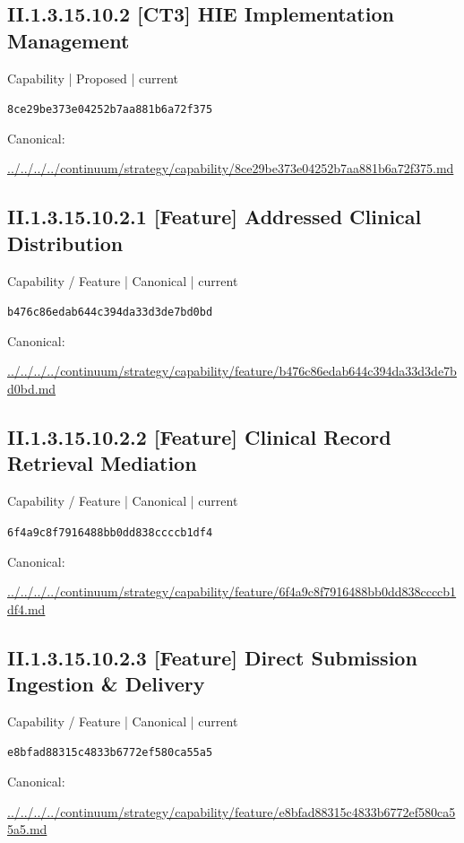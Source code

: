 \documentclass[10pt,a4paper]{article}
\begin{document}
\subsection*{II.1.3.15.10.2 [CT3] HIE Implementation Management}
{\small Capability | Proposed | current}\par
\texttt{8ce29be373e04252b7aa881b6a72f375}\par
Canonical: \par
{\footnotesize\url{../../../../continuum/strategy/capability/8ce29be373e04252b7aa881b6a72f375.md}}\par
\subsection*{II.1.3.15.10.2.1 [Feature] Addressed Clinical Distribution}
{\small Capability / Feature | Canonical | current}\par
\texttt{b476c86edab644c394da33d3de7bd0bd}\par
Canonical: \par
{\footnotesize\url{../../../../continuum/strategy/capability/feature/b476c86edab644c394da33d3de7bd0bd.md}}\par
\subsection*{II.1.3.15.10.2.2 [Feature] Clinical Record Retrieval Mediation}
{\small Capability / Feature | Canonical | current}\par
\texttt{6f4a9c8f7916488bb0dd838ccccb1df4}\par
Canonical: \par
{\footnotesize\url{../../../../continuum/strategy/capability/feature/6f4a9c8f7916488bb0dd838ccccb1df4.md}}\par
\subsection*{II.1.3.15.10.2.3 [Feature] Direct Submission Ingestion \& Delivery}
{\small Capability / Feature | Canonical | current}\par
\texttt{e8bfad88315c4833b6772ef580ca55a5}\par
Canonical: \par
{\footnotesize\url{../../../../continuum/strategy/capability/feature/e8bfad88315c4833b6772ef580ca55a5.md}}\par
\end{document}
